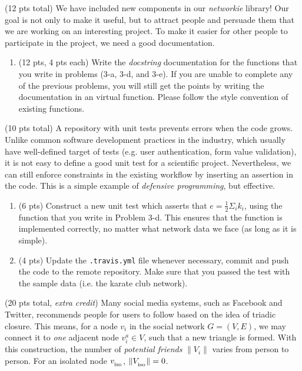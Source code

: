 \documentclass[10pt]{article}
\begin{document}
\begin{enumerate}
{\begin{enumerate}
	\end{enumerate}
	\item{(12 pts total) We have included new components in our {\it networkie} library! Our goal is not only to make it useful, but to attract people and persuade them that we are working on an interesting project. To make it easier for other people to participate in the project, we need a good documentation.
	\begin{enumerate}
		\item{(12 pts, 4 pts each) Write the {\it docstring} documentation for the functions that you write in problems (3-a, 3-d, and 3-e). If you are unable to complete any of the previous problems, you will still get the points by writing the documentation in an virtual function. Please follow the style convention of existing functions.}
	\end{enumerate}
	}
	\item{(10 pts total)
	A repository with unit tests prevents errors when the code grows. Unlike common software development practices in the industry, which usually have well-defined target of tests (e.g. user authentication, form value validation), it is not easy to define a good unit test for a scientific project. Nevertheless, we can still enforce constraints in the existing workflow by inserting an assertion in the code. This is a simple example of {\it defensive programming}, but effective.
	\begin{enumerate}
		\item{(6 pts) Construct a new unit test which asserts that $e = \frac{1}{2}\Sigma_i{k_i}$, using the function that you write in Problem 3-d. This ensures that the function is implemented correctly, no matter what network data we face (as long as it is simple).}
		\item{(4 pts) Update the \texttt{.travis.yml} file whenever necessary, commit and push the code to the remote repository. Make sure that you passed the test with the sample data (i.e. the karate club network).}
	\end{enumerate}	
	
	}
	\item{ (20 pts total, {\it extra credit}) Many social media systems, such as Facebook and Twitter, recommends people for users to follow based on the idea of triadic closure. This means, for a node $v_i$ in the social network $G = (V, E)$, we may connect it to {\it one} adjacent node $v_i^a \in V$, such that a new triangle is formed. With this construction, the number of {\it potential friends} $\| V_i \|$ varies from person to person. For an isolated node $v_\textsubscript{iso}$, $\| V_\textsubscript{iso} \| = 0$.
	
}}
\end{enumerate}
\end{document}
